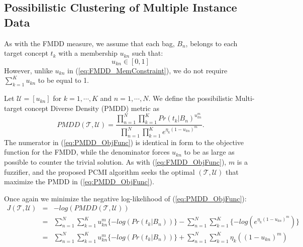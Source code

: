 \documentclass[12pt,dvips]{report}
\numberwithin{equation}{section}
\begin{document}
\subsection{Possibilistic Clustering of Multiple Instance Data} \label{subsec:PCMI}

As with the FMDD measure, we assume that each bag, $B_n$, belongs to each target concept $t_k$ with a membership $u_{kn}$ such that:
\begin{equation} \label{eq:PMDD_MemConstraint}
u_{kn}\in [0,1] 
\end{equation}
However, unlike $u_{kn}$ in (\ref{eq:FMDD_MemConstraint}), we do not require $\sum_{k=1}^{K}u_{kn}$ to be equal to 1.


Let $\mathcal{U}$$=$$[u_{kn}]$ for $k=1,\cdots,K$ and $n=1, \cdots, N$.
We define the possibilistic Multi-target concept Diverse Density (PMDD) metric as
\begin{equation} \label{eq:PMDD_ObjFunc}
PMDD(\mathcal{T}, \mathcal{U})=\frac{\prod_{n=1}^{N}\prod_{k=1}^{K}Pr(t_{k}\vert B_{n})^{u_{kn}^{m}}}{\prod_{n=1}^{N}\prod_{k=1}^{K}e^{\eta_{k}(1-u_{kn})^{m}}}.
 \end{equation}
The numerator in (\ref{eq:PMDD_ObjFunc}) is identical in form to the objective function for the FMDD, while the denominator forces $u_{kn}$ to be as large as possible to counter the trivial solution.  As with (\ref{eq:FMDD_ObjFunc}), $m$ is a fuzzifier, and the proposed PCMI algorithm seeks the optimal $(\mathcal{T}, \mathcal{U})$ that maximize the PMDD in (\ref{eq:PMDD_ObjFunc}).

Once again we minimize the negative log-likelihood of (\ref{eq:PMDD_ObjFunc}):
\begin{eqnarray}  \label{eq:PMDD_neglog}
J(\mathcal{T}, \mathcal{U})  & = & -log(PMDD(\mathcal{T}, \mathcal{U}))   \nonumber \\
    & = & \sum_{n=1}^{N}\sum_{k=1}^{K} u_{kn}^{m} \{-log(Pr(t_{k}\vert B_{n}))\}-\sum_{n=1}^{N}\sum_{k=1}^{K} \{-log(e^{\eta_{k}(1-u_{kn})^{m}})\} \nonumber\\
    & = & \sum_{n=1}^{N}\sum_{k=1}^{K} u_{kn}^{m} \{-log(Pr(t_{k}\vert B_{n}))\}+\sum_{n=1}^{N}\sum_{k=1}^{K} \eta_{k}((1-u_{kn})^{m})
 \end{eqnarray}
\end{document}
